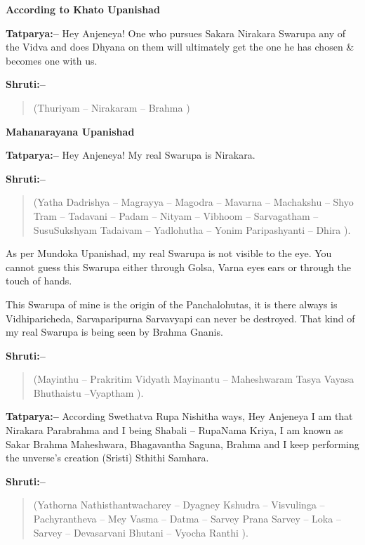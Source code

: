 \begin{flushright}
\textbf{According to Khato Upanishad}
\end{flushright}

\textbf{Tatparya:–} Hey Anjeneya! One who pursues Sakara Nirakara Swarupa any of the Vidva and does Dhyana on them will ultimately get the one he has chosen \& becomes one with us.

\textbf{Shruti:–}

\begin{verse}
(Thuriyam – Nirakaram – Brahma )
\end{verse}

\begin{flushright}
\textbf{Mahanarayana Upanishad}
\end{flushright}

\textbf{Tatparya:–} Hey Anjeneya! My real Swarupa is Nirakara.

\textbf{Shruti:–}

\begin{verse}
(Yatha Dadrishya – Magrayya – Magodra – Mavarna – Machakshu – Shyo Tram – Tadavani – Padam – Nityam – Vibhoom – Sarvagatham – SusuSukshyam Tadaivam – Yadlohutha – Yonim Paripashyanti – Dhira ).
\end{verse}

As per Mundoka Upanishad, my real Swarupa is not visible to the eye. You cannot guess this Swarupa either through Golsa, Varna eyes ears or through the touch of hands.

This Swarupa of mine is the origin of the Panchalohutas, it is there always is Vidhiparicheda, Sarvaparipurna Sarvavyapi can never be destroyed. That kind of my real Swarupa is being seen by Brahma Gnanis.

\textbf{Shruti:–}

\begin{verse}
(Mayinthu – Prakritim Vidyath Mayinantu – Maheshwaram  Tasya Vayasa Bhuthaistu –Vyaptham ).
\end{verse}

\textbf{Tatparya:–} According Swethatva Rupa Nishitha ways, Hey Anjeneya I am that Nirakara Parabrahma and I being Shabali – RupaNama Kriya, I am known as Sakar Brahma Maheshwara, Bhagavantha Saguna, Brahma and I keep performing the unverse's creation (Sristi) Sthithi Samhara.

\textbf{Shruti:–}

\begin{verse}
(Yathorna Nathisthantwacharey – Dyagney Kshudra – Visvulinga – Pachyrantheva – Mey Vasma – Datma – Sarvey Prana Sarvey – Loka – Sarvey – Devasarvani Bhutani – Vyocha Ranthi ).
\end{verse}

